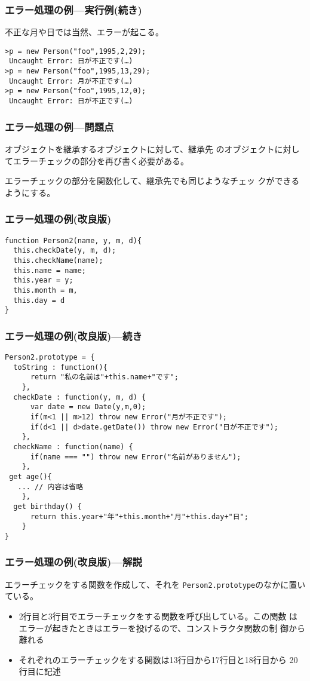 \documentclass[dvipsk]{beamer}
\begin{document}
\begin{frame}[containsverbatim]
 \frametitle{エラー処理の例---実行例(続き)}
 不正な月や日では当然、エラーが起こる。
\begin{verbatim}
>p = new Person("foo",1995,2,29);
 Uncaught Error: 日が不正です(…)
>p = new Person("foo",1995,13,29);
 Uncaught Error: 月が不正です(…)
>p = new Person("foo",1995,12,0);
 Uncaught Error: 日が不正です(…)
\end{verbatim}
 \end{frame}
\begin{frame}[containsverbatim]
 \frametitle{エラー処理の例---問題点}
オブジェクトを継承するオブジェクトに対して、継承先
 のオブジェクトに対してエラーチェックの部分を再び書く必要がある。

エラーチェックの部分を関数化して、継承先でも同じようなチェッ
 クができるようにする。
\end{frame}
\begin{frame}[containsverbatim]
 \frametitle{エラー処理の例(改良版)}
\begin{verbatim}
function Person2(name, y, m, d){
  this.checkDate(y, m, d);
  this.checkName(name);
  this.name = name;
  this.year = y;
  this.month = m,
  this.day = d
}
\end{verbatim}
 \end{frame}
\begin{frame}[containsverbatim]
 \frametitle{エラー処理の例(改良版)---続き}
{\small
\begin{verbatim}
Person2.prototype = {
  toString : function(){
      return "私の名前は"+this.name+"です";
    },
  checkDate : function(y, m, d) {
      var date = new Date(y,m,0);
      if(m<1 || m>12) throw new Error("月が不正です");
      if(d<1 || d>date.getDate()) throw new Error("日が不正です");
    },
  checkName : function(name) {
      if(name === "") throw new Error("名前がありません");
    },
 get age(){
   ... // 内容は省略
    },
  get birthday() {
      return this.year+"年"+this.month+"月"+this.day+"日";
    }
}
\end{verbatim}
 }
 \end{frame}
\begin{frame}[containsverbatim]
 \frametitle{エラー処理の例(改良版)---解説}
エラーチェックをする関数を作成して、それを
 \texttt{Person2.prototype}のなかに置いている。
\begin{itemize}
 \item 2行目と3行目でエラーチェックをする関数を呼び出している。この関数
			 はエラーが起きたときはエラーを投げるので、コンストラクタ関数の制
			 御から離れる
 \item それぞれのエラーチェックをする関数は13行目から17行目と18行目から
			 20行目に記述
\end{itemize}
 \end{frame}
\end{document}
